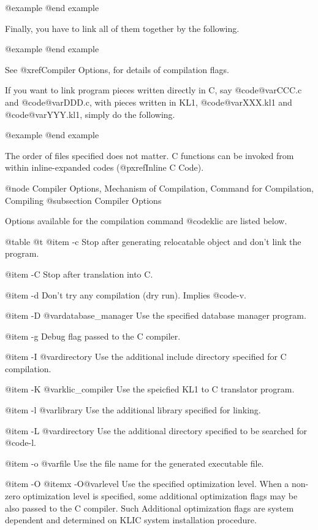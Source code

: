 {{{{@example
@end example

Finally, you have to link all of them together by the following.

@example
@end example

See @xref{Compiler Options}, for details of compilation flags.

If you want to link program pieces written directly in C, say
@code{@var{CCC}.c} and @code{@var{DDD}.c}, with pieces written in KL1,
@code{@var{XXX}.kl1} and @code{@var{YYY}.kl1}, simply do the following.

@example
@end example

The order of files specified does not matter.  C functions can be
invoked from within inline-expanded codes (@pxref{Inline C Code}).

@node Compiler Options, Mechanism of Compilation, Command for Compilation, Compiling
@subsection Compiler Options

Options available for the compilation command @code{klic} are listed
below.

@table @t
@item -c
Stop after generating relocatable object and don't link the program.

@item -C
Stop after translation into C.

@item -d
Don't try any compilation (dry run).  Implies @code{-v}.

@item -D @var{database_manager}
Use the specified database manager program.

@item -g
Debug flag passed to the C compiler.

@item -I @var{directory}
Use the additional include directory specified for C compilation.

@item -K @var{klic_compiler}
Use the speicfied KL1 to C translator program.

@item -l @var{library}
Use the additional library specified for linking.

@item -L @var{directory}
Use the additional directory specified to be searched for @code{-l}.

@item -o @var{file}
Use the file name for the generated executable file.

@item -O
@itemx -O@var{level}
Use the specified optimization level.  When a non-zero optimization
level is specified, some additional optimization flags may be also
passed to the C compiler.  Such Additional optimization flags are system
dependent and determined on KLIC system installation procedure.

}}}}
